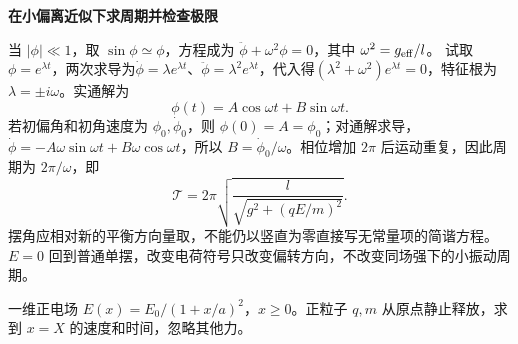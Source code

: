 \begin{solution}
\par\medskip{}\noindent\textbf{在小偏离近似下求周期并检查极限}\par\nobreak
当 $|\phi|\ll1$，取 $\sin\phi\simeq\phi$，方程成为
$\ddot\phi+\omega^2\phi=0$，其中 $\omega^2=g_{\rm eff}/l$。
试取$\phi=e^{\lambda t}$，两次求导为$\dot\phi=\lambda e^{\lambda t}$、$\ddot\phi=\lambda^2e^{\lambda t}$，代入得$(\lambda^2+\omega^2)e^{\lambda t}=0$，特征根为$\lambda=\pm i\omega$。实通解为
\[
\phi(t)=A\cos\omega t+B\sin\omega t.
\]
若初偏角和初角速度为 $\phi_0,\dot\phi_0$，则 $\phi(0)=A=\phi_0$；对通解求导，
$\dot\phi=-A\omega\sin\omega t+B\omega\cos\omega t$，所以
$B=\dot\phi_0/\omega$。相位增加 $2\pi$ 后运动重复，因此周期为 $2\pi/\omega$，即
\[
 \mathcal T=2\pi\sqrt{\frac l{\sqrt{g^2+(qE/m)^2}}}.
\]
摆角应相对新的平衡方向量取，不能仍以竖直为零直接写无常量项的简谐方程。$E=0$ 回到普通单摆，改变电荷符号只改变偏转方向，不改变同场强下的小振动周期。\end{solution}
\begin{question}\begin{example}[反平方衰减电场的飞行时间]\label{e6:example:15}
一维正电场 $E(x)=E_0/(1+x/a)^2$，$x\ge0$。正粒子 $q,m$ 从原点静止释放，求到 $x=X$ 的速度和时间，忽略其他力。
\end{example}
\end{question}
